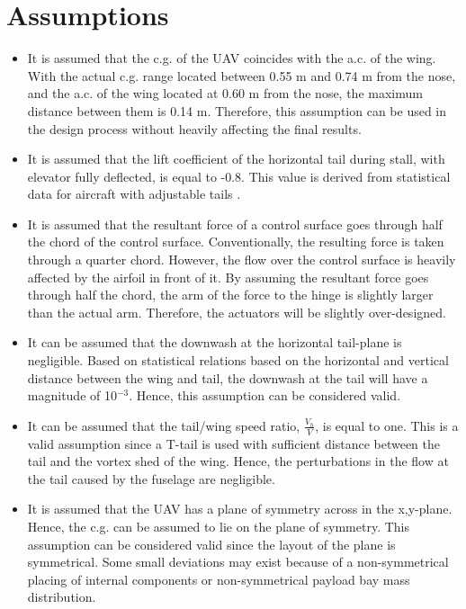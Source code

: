 \section{Assumptions}
\label{sec:assu_snc}

\begin{itemize}
    \item It is assumed that the c.g. of the UAV coincides with the a.c. of the wing. With the actual c.g. range located between 0.55 m and 0.74 m from the nose, and the a.c. of the wing located at 0.60 m from the nose, the maximum distance between them is 0.14 m. Therefore, this assumption can be used in the design process without heavily affecting the final results.
    \item It is assumed that the lift coefficient of the horizontal tail during stall, with elevator fully deflected, is equal to -0.8. This value is derived from statistical data for aircraft with adjustable tails \cite{SEAD}.
    \item It is assumed that the resultant force of a control surface goes through half the chord of the control surface. Conventionally, the resulting force is taken through a quarter chord. However, the flow over the control surface is heavily affected by the airfoil in front of it. By assuming the resultant force goes through half the chord, the arm of the force to the hinge is slightly larger than the actual arm. Therefore, the actuators will be slightly over-designed.
    \item It can be assumed that the downwash at the horizontal tail-plane is negligible. Based on statistical relations based on the horizontal and vertical distance between the wing and tail, the downwash at the tail will have a magnitude of 10$^{-3}$. Hence, this assumption can be considered valid. 
    \item It can be assumed that the tail/wing speed ratio, $\frac{V_h}{V}$, is equal to one. This is a valid assumption since a T-tail is used with sufficient distance between the tail and the vortex shed of the wing. Hence, the perturbations in the flow at the tail caused by the fuselage are negligible. 
    \item It is assumed that the UAV has a plane of symmetry across in the x,y-plane. Hence, the c.g. can be assumed to lie on the plane of symmetry. This assumption can be considered valid since the layout of the plane is symmetrical. Some small deviations may exist because of a non-symmetrical placing of internal components or non-symmetrical payload bay mass distribution.

\end{itemize}
